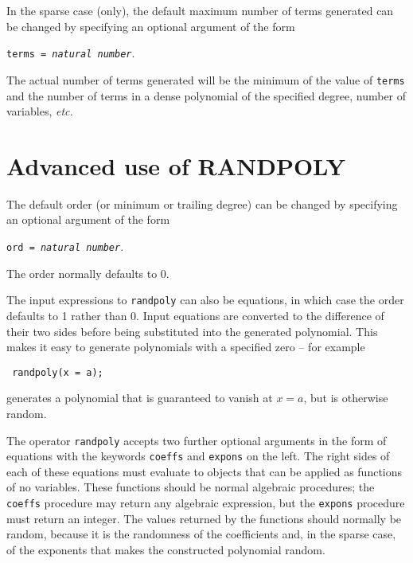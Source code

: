 \documentclass[11pt,letterpaper]{book}
\begin{document}
In the sparse case (only), the default maximum number of terms
generated can be changed by specifying an optional argument of the
form
\begin{center}
  {\tt terms = {\it natural number}}.
\end{center}
The actual number of terms generated will be the minimum of the value
of {\tt terms} and the number of terms in a dense polynomial of the
specified degree, number of variables, {\em etc.}


\section{Advanced use of RANDPOLY}

The default order (or minimum or trailing degree) can be changed by
specifying an optional argument of the form
\begin{center}
  {\tt ord = {\it natural number}}.
\end{center}
The order normally defaults to 0.

The input expressions to {\tt randpoly} can also be
equations, in which case the order defaults to 1 rather than 0.  Input
equations are converted to the difference of their two sides before
being substituted into the generated polynomial.  This makes it easy
to generate polynomials with a specified zero -- for example
\begin{center}\tt
  randpoly(x = a);
\end{center}
generates a polynomial that is guaranteed to vanish at $x = a$, but is
otherwise random.

The operator {\tt randpoly} accepts two further optional arguments in
the form of equations with the keywords {\tt coeffs}
 and {\tt expons}
on the left.  The right sides of each of these equations must evaluate
to objects that can be applied as functions of no variables.  These
functions should be normal algebraic procedures; the {\tt coeffs}
procedure may return any algebraic expression, but the {\tt expons}
procedure must return an integer.  The values returned by
the functions should normally be random, because it is the randomness
of the coefficients and, in the sparse case, of the exponents that
makes the constructed polynomial random.
\end{document}
